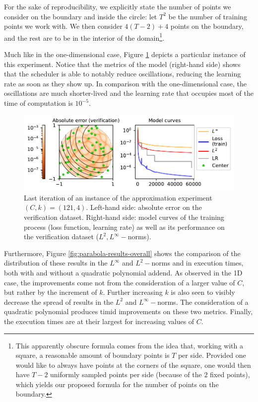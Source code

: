 \documentclass[12pt]{report} %
\begin{document}
For the sake of reproducibility, we explicitly state the number of points we consider on the boundary and inside the circle: let $T^2$ be the number of training points we work with. We then consider $4 (T - 2) + 4$ points on the boundary, and the rest are to be in the interior of the domain\footnote{This apparently obscure formula comes from the idea that, working with a square, a reasonable amount of boundary points is $T$ per side. Provided one would like to always have points at the corners of the square, one would then have $T-2$ uniformly sampled points per side (because of the $2$ fixed points), which yields our proposed formula for the number of points on the boundary.}.

Much like in the one-dimensional case, Figure \ref{fig:parabola-example-training-TR22-C121} depicts a particular instance of this experiment. Notice that the metrics of the model (right-hand side) shows that the scheduler is able to notably reduce oscillations, reducing the learning rate as soon as they show up. In comparison with the one-dimensional case, the oscillations are much shorter-lived and the learning rate that occupies most of the time of computation is $10^{-5}$.

\begin{figure}[h]
  \includegraphics[width=\textwidth]{imagenes/experiments/2d/statistical_2d_full_scheduler_interpolation/parabola/parabola-TR22-C121-Kgaussian_kernel-Sh2.5635-5-E57813.pdf}
  \caption{Last iteration of an instance of the approximation experiment $(C,k)=(121,4)$. Left-hand side: absolute error on the verification dataset. Right-hand side: model curves of the training process (loss function, learning rate) as well as its performance on the verification dataset ($L^2, L^\infty-$norms).}
  \label{fig:parabola-example-training-TR22-C121}
\end{figure}

Furthermore, Figure \ref{fig:parabola-results-overall} shows the comparison of the distribution of these results in the $L^\infty$ and $L^2-$norms and in execution times, both with and without a quadratic polynomial addend. As observed in the 1D case, the improvements come not from the consideration of a larger value of $C$, but rather by the increment of $k$. Further increasing $k$ is also seen to visibly decrease the spread of results in the $L^2$ and $L^\infty-$norms. The consideration of a quadratic polynomial produces timid improvements on these two metrics. Finally, the execution times are at their largest for increasing values of $C$. 
\end{document}
